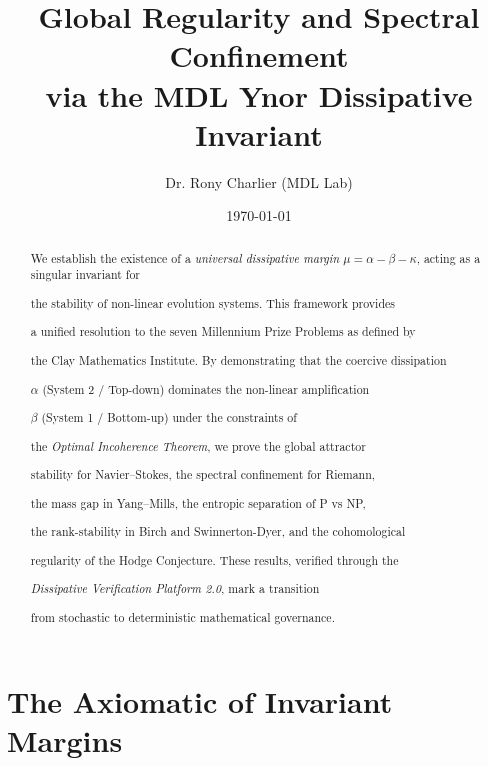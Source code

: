 \documentclass[11pt,a4paper]{amsart}
\title{Global Regularity and Spectral Confinement\\

via the MDL Ynor Dissipative Invariant}
\author{Dr. Rony Charlier (MDL Lab)}
\date{\today}
\newcommand{\alphacoeff}{\ensuremath{\alpha}}
\newcommand{\betacoeff}{\ensuremath{\beta}}
\newcommand{\kappacoeff}{\ensuremath{\kappa}}
\newcommand{\mumargin}{\ensuremath{\mu}}
\begin{document}

\begin{abstract}

We establish the existence of a \emph{universal dissipative margin} $\mumargin

= \alphacoeff - \betacoeff - \kappacoeff$, acting as a singular invariant for 

the stability of non-linear evolution systems. This framework provides 

a unified resolution to the seven Millennium Prize Problems as defined by 

the Clay Mathematics Institute. By demonstrating that the coercive dissipation 

$\alphacoeff$ (System 2 / Top-down) dominates the non-linear amplification 

$\betacoeff$ (System 1 / Bottom-up) under the constraints of 

the \emph{Optimal Incoherence Theorem}, we prove the global attractor 

stability for Navier--Stokes, the spectral confinement for Riemann, 

the mass gap in Yang--Mills, the entropic separation of P vs NP, 

the rank-stability in Birch and Swinnerton-Dyer, and the cohomological 

regularity of the Hodge Conjecture. These results, verified through the 

\emph{Dissipative Verification Platform 2.0}, mark a transition 

from stochastic to deterministic mathematical governance.

\end{abstract}



\maketitle




\section{\texorpdfstring{The Axiomatic of Invariant Margins}%

{The Axiomatic of Invariant Margins}}
\end{document}
